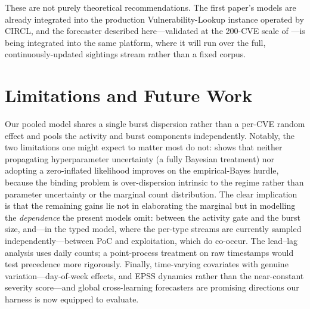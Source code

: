 \documentclass[]{article}
\begin{document}
These are not purely theoretical recommendations. The first paper's models are
already integrated into the production Vulnerability-Lookup instance operated by
CIRCL, and the forecaster described here---validated at the 200-CVE scale of
---is being integrated into the same platform, where it will run
over the full, continuously-updated sightings stream rather than a fixed corpus.

\section{Limitations and Future Work}\label{sec:future}
Our pooled model shares a single burst dispersion rather than a per-CVE random
effect and pools the activity and burst components independently. Notably, the two
limitations one might expect to matter most do not:  shows that
neither propagating hyperparameter uncertainty (a fully Bayesian treatment) nor
adopting a zero-inflated likelihood improves on the empirical-Bayes hurdle, because
the binding problem is over-dispersion intrinsic to the regime rather than
parameter uncertainty or the marginal count distribution. The clear implication is
that the remaining gains lie not in elaborating the marginal but in modelling the
\emph{dependence} the present models omit: between the activity gate and the burst
size, and---in the typed model, where the per-type streams are currently sampled
independently---between PoC and exploitation, which do co-occur.
The lead--lag analysis uses daily counts; a point-process treatment on raw
timestamps would test precedence more rigorously. Finally, time-varying covariates
with genuine variation---day-of-week effects, and EPSS
\cite{jacobs2023enhancingvulnerabilityprioritizationdatadriven} dynamics rather
than the near-constant severity score---and global cross-learning forecasters
\cite{salinas2020deepar} are promising directions our harness is now equipped to
evaluate.
\end{document}
